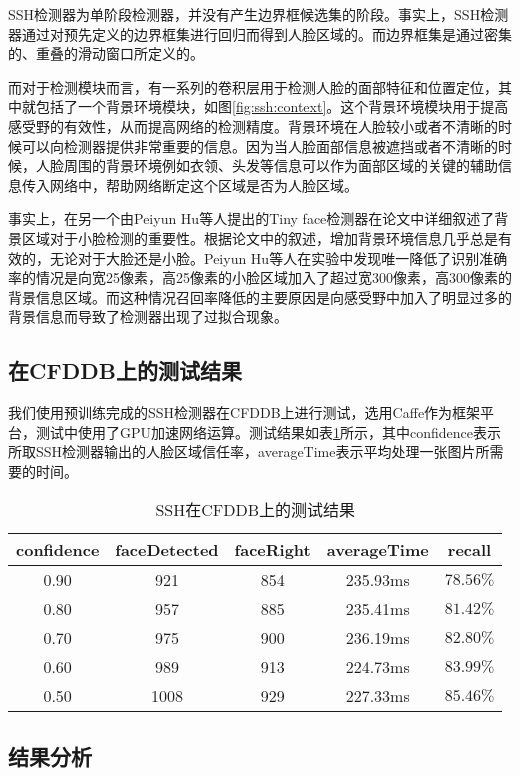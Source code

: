 SSH检测器为单阶段检测器，并没有产生边界框候选集的阶段。事实上，SSH检测器通过对预先定义的边界框集进行回归而得到人脸区域的。而边界框集是通过密集的、重叠的滑动窗口所定义的。

而对于检测模块而言，有一系列的卷积层用于检测人脸的面部特征和位置定位，其中就包括了一个背景环境模块，如图\ref{fig:ssh:context}\cite{najibi2017ssh}。这个背景环境模块用于提高感受野的有效性，从而提高网络的检测精度。背景环境在人脸较小或者不清晰的时候可以向检测器提供非常重要的信息。因为当人脸面部信息被遮挡或者不清晰的时候，人脸周围的背景环境例如衣领、头发等信息可以作为面部区域的关键的辅助信息传入网络中，帮助网络断定这个区域是否为人脸区域。

事实上，在另一个由Peiyun Hu等人提出的Tiny face检测器\cite{hu2017finding}在论文中详细叙述了背景区域对于小脸检测的重要性。根据论文中的叙述，增加背景环境信息几乎总是有效的，无论对于大脸还是小脸。Peiyun Hu等人在实验中发现唯一降低了识别准确率的情况是向宽25像素，高25像素的小脸区域加入了超过宽300像素，高300像素的背景信息区域。而这种情况召回率降低的主要原因是向感受野中加入了明显过多的背景信息而导致了检测器出现了过拟合现象。


\subsection{在CFDDB上的测试结果}
\label{chap2:sshresult}

我们使用预训练完成的SSH检测器在CFDDB上进行测试，选用Caffe作为框架平台，测试中使用了GPU加速网络运算。测试结果如表\ref{tab:ssh}所示，其中confidence表示所取SSH检测器输出的人脸区域信任率，averageTime表示平均处理一张图片所需要的时间。

\begin{table}[!hpb]
	\centering
	\caption{SSH在CFDDB上的测试结果}
	\label{tab:ssh}
	\begin{tabular}{ cccc | c }
		\hline
		confidence & faceDetected & faceRight & averageTime & recall\\
		\hline
		0.90 & 921 & 854 & 235.93ms & $78.56\%$\\
		0.80 & 957 & 885 & 235.41ms & $81.42\%$\\
		0.70 & 975 & 900 & 236.19ms & $82.80\%$\\
		0.60 & 989 & 913 & 224.73ms & $83.99\%$\\
		0.50 & 1008 & 929 & 227.33ms & $85.46\%$\\
		\hline
	\end{tabular}
\end{table}

\subsection{结果分析}


